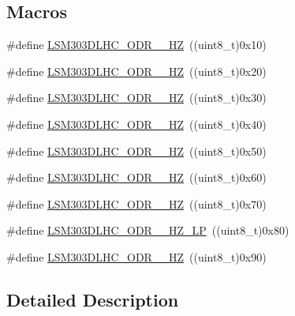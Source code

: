 \subsection*{Macros}
\begin{DoxyCompactItemize}
\item 
\#define \hyperlink{group__Acc__OutPut__DataRate__Selection_gaf267016ce4c6d30d43d348d34b41dd73}{L\+S\+M303\+D\+L\+H\+C\+\_\+\+O\+D\+R\+\_\+\_\+\+H\+Z}~((uint8\+\_\+t)0x10)
\item 
\#define \hyperlink{group__Acc__OutPut__DataRate__Selection_ga725bcabb8e090e509645813bb275d2b6}{L\+S\+M303\+D\+L\+H\+C\+\_\+\+O\+D\+R\+\_\+\_\+\+H\+Z}~((uint8\+\_\+t)0x20)
\item 
\#define \hyperlink{group__Acc__OutPut__DataRate__Selection_gac14c515af9b27e40043ad4a70817d904}{L\+S\+M303\+D\+L\+H\+C\+\_\+\+O\+D\+R\+\_\+\_\+\+H\+Z}~((uint8\+\_\+t)0x30)
\item 
\#define \hyperlink{group__Acc__OutPut__DataRate__Selection_gaf03995ebfe297ae90fb1d190773b1efc}{L\+S\+M303\+D\+L\+H\+C\+\_\+\+O\+D\+R\+\_\+\_\+\+H\+Z}~((uint8\+\_\+t)0x40)
\item 
\#define \hyperlink{group__Acc__OutPut__DataRate__Selection_ga42b9a17cb4fd9b2013a48382cae63fa6}{L\+S\+M303\+D\+L\+H\+C\+\_\+\+O\+D\+R\+\_\+\_\+\+H\+Z}~((uint8\+\_\+t)0x50)
\item 
\#define \hyperlink{group__Acc__OutPut__DataRate__Selection_gae6bf4fcd9f6cc8fc92ff12bebdb9c3ef}{L\+S\+M303\+D\+L\+H\+C\+\_\+\+O\+D\+R\+\_\+\_\+\+H\+Z}~((uint8\+\_\+t)0x60)
\item 
\#define \hyperlink{group__Acc__OutPut__DataRate__Selection_gafe0b7aa7e56a0dfbcd1458c9cb6fb078}{L\+S\+M303\+D\+L\+H\+C\+\_\+\+O\+D\+R\+\_\+\_\+\+H\+Z}~((uint8\+\_\+t)0x70)
\item 
\#define \hyperlink{group__Acc__OutPut__DataRate__Selection_gaf74333a59e36106c5bd2d4ab84a95519}{L\+S\+M303\+D\+L\+H\+C\+\_\+\+O\+D\+R\+\_\+\_\+\+H\+Z\+\_\+\+L\+P}~((uint8\+\_\+t)0x80)
\item 
\#define \hyperlink{group__Acc__OutPut__DataRate__Selection_gab91b27f43bae77ded54f89d1d9d827f4}{L\+S\+M303\+D\+L\+H\+C\+\_\+\+O\+D\+R\+\_\+\_\+\+H\+Z}~((uint8\+\_\+t)0x90)
\end{DoxyCompactItemize}


\subsection{Detailed Description}


